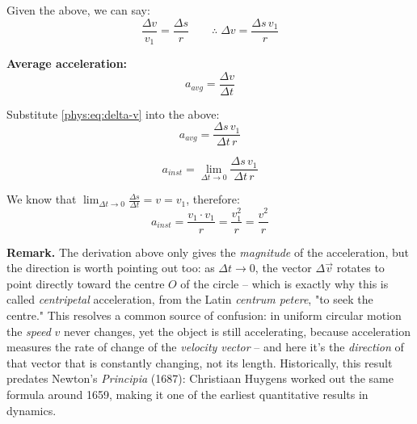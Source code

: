 \begin{center}
\begin{minipage}{0.42\textwidth}
\vspace{6pt}
\end{minipage}
\end{center}

\noindent
Given the above, we can say:
\begin{equation}
\frac{\Delta v}{v_1} = \frac{\Delta s}{r}
\qquad
\therefore\; \Delta v = \frac{\Delta s \, v_1}{r}
\label{phys:eq:delta-v}
\end{equation}

\noindent
\textbf{Average acceleration:}
\[
a_{avg} = \frac{\Delta v}{\Delta t}
\]

\noindent
Substitute \eqref{phys:eq:delta-v} into the above:
\[
a_{avg} = \frac{\Delta s \, v_1}{\Delta t \, r}
\]

\[
a_{inst} = \lim_{\Delta t \to 0} \frac{\Delta s \, v_1}{\Delta t \, r}
\]

\noindent
We know that $\displaystyle\lim_{\Delta t \to 0} \frac{\Delta s}{\Delta t} = v = v_1$, therefore:
\[
a_{inst} = \frac{v_1 \cdot v_1}{r} = \frac{v_1^2}{r} = \frac{v^2}{r}
\]

\begin{center}
\end{center}

\bigskip
\noindent\textbf{Remark.} The derivation above only gives the \emph{magnitude} of the acceleration, but the direction is worth pointing out too: as $\Delta t \to 0$, the vector $\Delta \vec{v}$ rotates to point directly toward the centre $O$ of the circle -- which is exactly why this is called \emph{centripetal} acceleration, from the Latin \textit{centrum petere}, "to seek the centre." This resolves a common source of confusion: in uniform circular motion the \emph{speed} $v$ never changes, yet the object is still accelerating, because acceleration measures the rate of change of the \emph{velocity vector} -- and here it's the \emph{direction} of that vector that is constantly changing, not its length. Historically, this result predates Newton's \textit{Principia} (1687): Christiaan Huygens worked out the same formula around 1659, making it one of the earliest quantitative results in dynamics.

